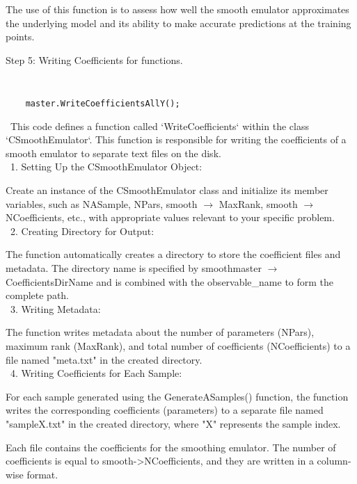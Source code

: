 \documentclass[12pt]{article}
\numberwithin{equation}{section}
\numberwithin{figure}{section}
\begin{document}
The use of this function is to assess how well the smooth emulator approximates the underlying model and its ability to make accurate predictions at the training points. \\


\begin{description}
\item[Step 5: Writing Coefficients for functions. ]
\end{description}

{\tt 
\begin{verbatim}
    master.WriteCoefficientsAllY(); 
\end{verbatim}
}

\ This code defines a function called `WriteCoefficients` within the class `CSmoothEmulator`. This function is responsible for writing the coefficients of a smooth emulator to separate text files on the disk. \\

\ 1. Setting Up the CSmoothEmulator Object:

Create an instance of the CSmoothEmulator class and initialize its member variables, such as NASample, NPars, smooth $\rightarrow$ MaxRank, smooth $\rightarrow$ NCoefficients, etc., with appropriate values relevant to your specific problem. \\

\ 2. Creating Directory for Output:

The function automatically creates a directory to store the coefficient files and metadata. The directory name is specified by smoothmaster $\rightarrow$ CoefficientsDirName and is combined with the observable\_name to form the complete path.\\ 

\ 3. Writing Metadata:

The function writes metadata about the number of parameters (NPars), maximum rank (MaxRank), and total number of coefficients (NCoefficients) to a file named "meta.txt" in the created directory. \\

\ 4. Writing Coefficients for Each Sample:

For each sample generated using the GenerateASamples() function, the function writes the corresponding coefficients (parameters) to a separate file named "sampleX.txt" in the created directory, where "X" represents the sample index. 

Each file contains the coefficients for the smoothing emulator. The number of coefficients is equal to smooth->NCoefficients, and they are written in a column-wise format. \\
\end{document}
